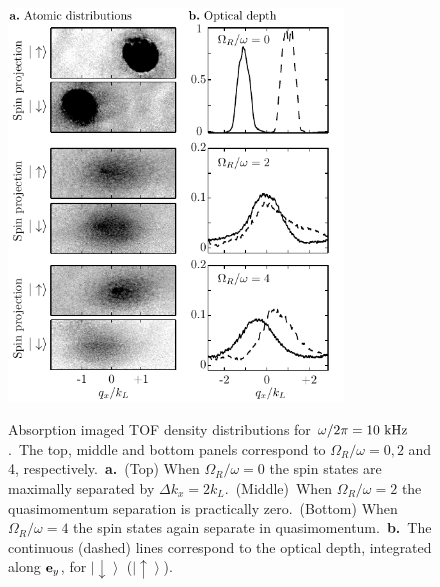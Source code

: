 \documentclass[twocolumn,amsmath,amssymb,floatfix,prl]{revtex4-1}
\newcommand{\ket}[1]{\left|#1\right>}
\begin{document}
\begin{figure}
 \begin{center}
 \includegraphics[width=3.5in]{epsfiles/Figure2.pdf}\\
 \end{center}
 \vspace{-0pt}
 \caption[OD Images.]{Absorption imaged TOF density distributions for $\omega/2\pi = 10~{\rm kHz}$.~The top, middle and bottom panels correspond to $\Omega_R/\omega=0, 2$ and 4, respectively.~{\bf a.}~(Top) When $\Omega_R/\omega=0$ the spin states are maximally separated by $\Delta k_x = 2k_L$.~(Middle)~When $\Omega_R/\omega=2$ the quasimomentum separation is practically zero.~(Bottom) When $\Omega_R/\omega=4$ the spin states again separate in quasimomentum.~{\bf b.}~The continuous (dashed) lines correspond to the optical depth, integrated along ${\bf e}_y$, for $\ket{\downarrow}$ ($\ket{\uparrow}$).}
 \label{fig:ODimages}
\end{figure}
\end{document}
